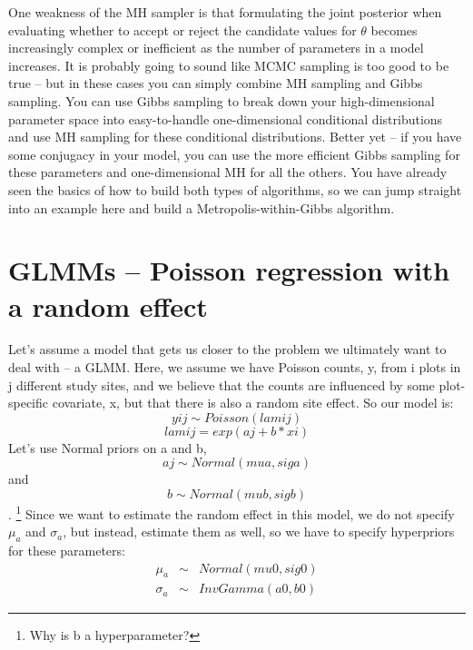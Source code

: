 One weakness of the MH sampler is that formulating the joint posterior when evaluating whether to accept or reject the candidate values for $\theta$ becomes increasingly complex or inefficient as the number of parameters in a model increases. It is probably going to sound like MCMC sampling is too good to be true – but in these cases you can simply combine MH sampling and Gibbs sampling. You can use Gibbs sampling to break down your high-dimensional parameter space into easy-to-handle one-dimensional conditional distributions and use MH sampling for these conditional distributions. Better yet – if you have some conjugacy in your model, you can use the more efficient Gibbs sampling for these parameters and one-dimensional MH for all the others. You have already seen the basics of how to build both types of algorithms, so we can jump straight into an example here and build a Metropolis-within-Gibbs algorithm.

\section{ GLMMs – Poisson regression with a random effect }

Let's assume a model that gets us closer to the problem we ultimately want to deal with – a GLMM. Here, we assume we have Poisson counts, y, from i plots in j different study sites, and we believe that the counts are influenced by some plot-specific covariate, x, but that there is also a random site effect. So our model is:
\[
yij \sim Poisson (lamij)
\]
\[
lamij = exp (aj + b*xi)
\]
Let's use Normal priors on a and b,  \[
aj \sim Normal (mua, siga)
\] 
and 
\[
b \sim Normal (mub, sigb)
\].
\footnote{Why is b a hyperparameter?}
Since we want to estimate the random effect in this model, we do not
specify $\mu_a$ and $\sigma_a$, but instead, estimate them as well, so we have
to specify hyperpriors for these parameters:
\begin{eqnarray*}
\mu_a  &\sim &  Normal(mu0, sig0)  \\
\sigma_{a} & \sim & InvGamma(a0, b0)
\end{eqnarray*}

